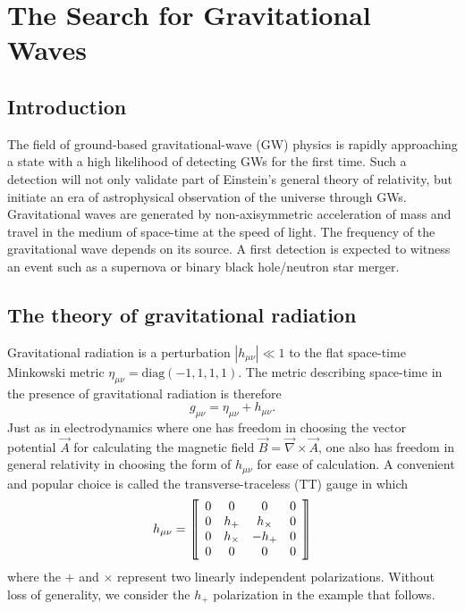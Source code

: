 \chapter{The Search for Gravitational Waves}

\section{Introduction}
The field of ground-based gravitational-wave (GW) physics is rapidly
approaching a state with a high likelihood of detecting GWs for the
first time. Such a detection will not only validate part of Einstein's
general theory of relativity, but initiate an era of astrophysical
observation of the universe through GWs. Gravitational waves are
generated by non-axisymmetric acceleration of mass and travel in the
medium of space-time at the speed of light. The frequency of the
gravitational wave depends on its source. A first detection is
expected to witness an event such as a supernova or binary black
hole/neutron star merger.

\section{The theory of gravitational radiation}
Gravitational radiation is a perturbation $|h_{\mu \nu}|
\ll 1$ to the flat space-time Minkowski metric $\eta_{\mu \nu} =
\mbox{diag}(-1, 1, 1, 1)$. The metric describing space-time in the
presence of gravitational radiation is therefore
\begin{equation}
g_{\mu\nu} = \eta_{\mu\nu} + h_{\mu\nu}.
\end{equation}
Just as in electrodynamics where one has freedom in choosing the
vector potential $\vec{A}$ for calculating the magnetic field $\vec{B}
= \vec{\nabla} \times \vec{A}$, one also has freedom in general
relativity in choosing the form of $h_{\mu \nu}$ for ease of calculation. A
convenient and popular choice is called the transverse-traceless (TT)
gauge in which
\begin{equation}
h_{\mu \nu} = 
\left\llbracket \begin{array}{c c c c} 
0 & 0 & 0 & 0\\ 
0 & h_+ & h_\times & 0 \\
0 & h_\times & -h_+ & 0 \\
0 & 0 & 0 & 0
\end{array} \right\rrbracket
\end{equation}
where the $+$ and $\times$ represent two linearly independent
polarizations. Without loss of generality, we consider the $h_+$
polarization in the example that follows.

